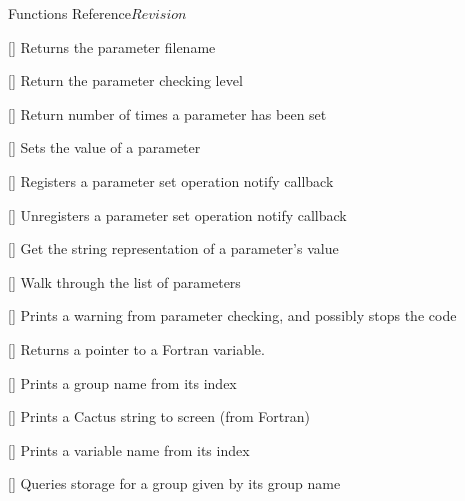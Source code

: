 \begin{cactuspart}{ Functions Reference}{}{$Revision$}
\begin{Lentry}
\item[\code{CCTK\_ParameterFilename}]
  [\pageref{CCTK-ParameterFilename}]
  Returns the parameter filename

\item[\code{CCTK\_ParameterLevel}]
  [\pageref{CCTK-ParameterLevel}]
  Return the parameter checking level

\item[\code{CCTK\_ParameterQueryTimesSet}]
  [\pageref{CCTK-ParameterQueryTimesSet}]
  Return number of times a parameter has been set

\item[\code{CCTK\_ParameterSet}]
  [\pageref{CCTK-ParameterSet}]
  Sets the value of a parameter

\item[\code{CCTK\_ParameterSetNotifyRegister}]
  [\pageref{CCTK-ParameterSetNotifyRegister}]
  Registers a parameter set operation notify callback

\item[\code{CCTK\_ParameterSetNotifyUnregister}]
  [\pageref{CCTK-ParameterSetNotifyUnregister}]
  Unregisters a parameter set operation notify callback

\item[\code{CCTK\_ParameterValString}]
  [\pageref{CCTK-ParameterValString}]
  Get the string representation of a parameter's value

\item[\code{CCTK\_ParameterWalk}]
  [\pageref{CCTK-ParameterWalk}]
  Walk through the list of parameters

\item[\code{CCTK\_PARAMWARN}] [\pageref{CCTK-PARAMWARN}]
  Prints a warning from parameter checking, and possibly stops the code

\item[\code{CCTK\_PointerTo}] [\pageref{CCTK-PointerTo}]
  Returns a pointer to a Fortran variable.

\item[\code{CCTK\_PrintGroup}] [\pageref{CCTK-PrintGroup}]
  Prints a group name from its index

\item[\code{CCTK\_PrintString}] [\pageref{CCTK-PrintString}]
  Prints a Cactus string to screen (from Fortran)

\item[\code{CCTK\_PrintVar}] [\pageref{CCTK-PrintVar}]
  Prints a variable name from its index

\item[\code{CCTK\_QueryGroupStorage}] [\pageref{CCTK-QueryGroupStorage}]
  Queries storage for a group given by its group name


\end{Lentry}
\end{cactuspart}
